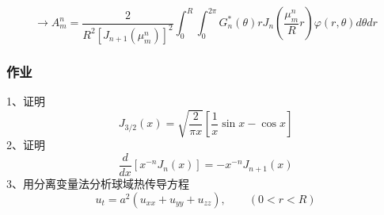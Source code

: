 \begin{frame}
	\begin{equation*}
		\to A_m ^n=	\frac{2}{R^2[J_{n+1}(\mu_m ^n)]^2} \int_0 ^{R} \int_0 ^{2\pi} G_n ^* (\theta) r J_n (\frac{\mu_{m}^{n}}{R}r) \varphi(r, \theta) d\theta dr 
	\end{equation*}
\end{frame}

\begin{frame}
	\frametitle{作业}
	1、证明 
	\begin{equation*}
		J_{3/2}(x)=\sqrt{\frac{2}{\pi x}} [\frac{1}{x}\sin x -\cos x]
	\end{equation*}
	2、证明
	\begin{equation*}
		\frac{d}{d x}\left[x^{-n} J_{n}(x)\right]=-x^{-n} J_{n+1}(x) 
	\end{equation*}	
	3、用分离变量法分析球域热传导方程
	\begin{equation*}
		u_t=a^2 (u_{xx}+u_{yy}+u_{zz}), \qquad (0<r<R)
	\end{equation*}	
\end{frame}	
